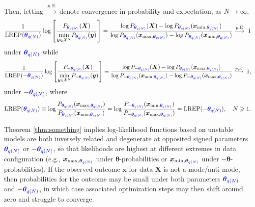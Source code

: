 \documentclass[numbib]{imamat}
\theoremstyle{theorem}
\theoremstyle{lemma}
\theoremstyle{example}
\theoremstyle{corollary}
\theoremstyle{definition}
\theoremstyle{remark}
\theoremstyle{approximation}
\theoremstyle{scheme}
\newcommand{\REP}{\mathrm{LREP}}
\newcommand{\thetaidx}{q(N)}
\newcommand{\thetaN}{\boldsymbol \theta_{\thetaidx}}
\newcommand{\ak}[1]{{\color{blue} #1}}
\begin{document}
Then, letting \(\stackrel{p, \mathrm{E}}{\longrightarrow}\) denote convergence in probability and expectation, as \(N\to \infty\),
\[
\frac{1}{\REP(\ak{\thetaN})} \log\left[ \frac{P_{\ak{\thetaN} }(\boldsymbol X) }{ \displaystyle{\min_{\boldsymbol y\in\mathcal{X}^N}} P_{\ak{\thetaN} }(\boldsymbol y)}\right] = \frac{ \log P_{\ak{\thetaN} } ( \boldsymbol X)  - \log P_{\ak{\thetaN} }(\boldsymbol{x}_{\min, \ak{\thetaN}}) }
{ \log P_{\ak{\thetaN} } (\boldsymbol{x}_{\max,\ak{\thetaN}})  - \log P_{\ak{\thetaN} }(\boldsymbol{x}_{\min, \ak{\thetaN}}) }
\stackrel{p, \mathrm{E}}{\longrightarrow}
\; 1
\]
under \(\ak{\thetaN}\) while
\[
\frac{1}{\REP(-\ak{\thetaN})} \log\left[ \frac{P_{-\ak{\thetaN} }(\boldsymbol X) }{  \displaystyle{\min_{\boldsymbol y\in\mathcal{X}^N}} P_{-\ak{\thetaN} }(\boldsymbol y)} \right]
=    \frac{ \log P_{-\ak{\thetaN} } ( \boldsymbol X) - \log P_{\ak{\thetaN} }(\boldsymbol{x}_{\max, \ak{\thetaN}})    }
{ \log P_{-\ak{\thetaN} } (\boldsymbol{x}_{\min, \ak{\thetaN}})  - \log P_{-\ak{\thetaN} }(\boldsymbol{x}_{\max, \ak{\thetaN}}) }
\stackrel{p,\mathrm{E}}{\longrightarrow}
\; 1,
\]
under \(-\ak{\thetaN}\), where
\[
\REP( \ak{\thetaN}) \equiv \log \frac{P_{\ak{\thetaN} } (\boldsymbol{x}_{\max, \ak{\thetaN}})}{P_{\ak{\thetaN} }(\boldsymbol{x}_{\min, \ak{\thetaN}})} = \log  \frac{P_{-\ak{\thetaN} } (\boldsymbol{x}_{\min, \ak{\thetaN}}) }{ P_{-\ak{\thetaN} }(\boldsymbol{x}_{\max, \ak{\thetaN}})}=   \REP( -\ak{\thetaN}), \quad N \geq 1.
\]

Theorem \ref{thm:something} \ak{implies} log-likelihood functions based on unstable models are both inversely related and degenerate at opposited signed parameters \(\ak{\thetaN}\) or \(-\ak{\thetaN}\), so that likelihoods are highest at different extremes in data configuration (e.g., \(\boldsymbol{x}_{\max, \ak{\thetaN}}\) under \(\boldsymbol \theta\)-probabilities or \(\boldsymbol{x}_{\min, \ak{\thetaN}}\) under \(-\boldsymbol \theta\)-probabilities). If the observed outcome \(\boldsymbol x\) for data \(\boldsymbol X\) is not a mode/anti-mode, then probabilities for the outcome may be small under both parameters \(\ak{\thetaN}\) and \(-\ak{\thetaN}\), in which case associated optimization steps may then shift around zero and struggle to converge.
\end{document}

